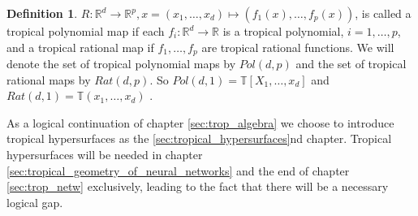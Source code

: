 \documentclass{article}
\theoremstyle{definition}
\newtheorem{lemma}[theorem]{Lemma}
\newtheorem{definition}[theorem]{Definition}
\begin{document}
\begin{definition}
$R : \mathbb{R}^{d} \to \mathbb{R}^{p}, x = (x_1, \dots , x_d)\mapsto (f_1(x), \dots , f_p(x))$, is called a tropical polynomial map if each $f_i : \mathbb{R}^{d} \to \mathbb{R}$ is a tropical polynomial, $i = 1, \dots , p$, and a tropical rational map if $f_1, \dots , f_p$ are tropical rational functions. We will denote the set of tropical polynomial maps by $Pol(d, p)$ and the set of tropical rational maps by $Rat(d, p)$. So $Pol(d, 1) = \mathbb{T}[X_1, \dots , x_d]$ and $Rat(d, 1) = \mathbb{T}(x_1, \dots , x_d)$ \cite[p.~3]{zhang2018tropical}.
\end{definition}

As a logical continuation of chapter \ref{sec:trop_algebra} we choose to introduce tropical hypersurfaces as the \ref{sec:tropical_hypersurfaces}nd chapter. Tropical hypersurfaces will be needed in chapter \ref{sec:tropical_geometry_of_neural_networks} and the end of chapter \ref{sec:trop_netw} exclusively, leading to the fact that there will be a necessary logical gap.

\newpage

%
\end{document}
